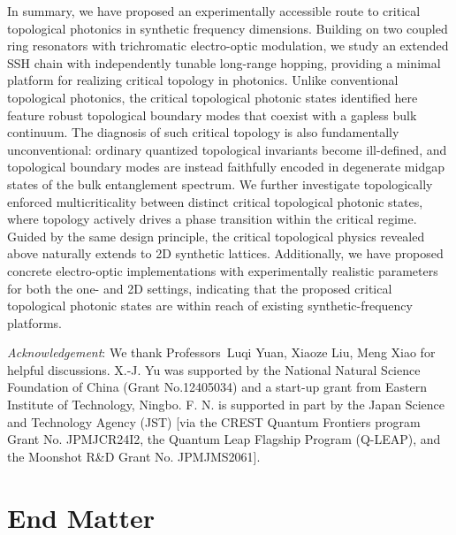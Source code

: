 \documentclass[aps,prl,twocolumn,preprintnumbers,amsmath,amssymb,superscriptaddress,10pt]{revtex4-2}
\begin{document}
In summary, we have proposed an experimentally accessible route to critical topological photonics in synthetic frequency dimensions. Building on two coupled ring resonators with trichromatic electro-optic modulation, we study an extended SSH chain with independently tunable long-range hopping, providing a minimal platform for realizing critical topology in photonics. Unlike conventional topological photonics, the critical topological photonic states identified here feature robust topological boundary modes that coexist with a gapless bulk continuum. The diagnosis of such critical topology is also fundamentally unconventional: ordinary quantized topological invariants become ill-defined, and topological boundary modes are instead faithfully encoded in degenerate midgap states of the bulk entanglement spectrum. We further investigate topologically enforced multicriticality between distinct critical topological photonic states, where topology actively drives a phase transition within the critical regime. Guided by the same design principle, the critical topological physics revealed above naturally extends to 2D synthetic lattices. Additionally, we have proposed concrete electro-optic implementations with experimentally realistic parameters for both the one- and 2D settings, indicating that the proposed critical topological photonic states are within reach of existing synthetic-frequency platforms.



\textit{Acknowledgement}:
We thank Professors~Luqi Yuan, Xiaoze Liu, Meng Xiao for helpful discussions.
X.-J. Yu was supported by the National Natural Science Foundation of China (Grant No.12405034) and a start-up grant from Eastern Institute of Technology, Ningbo. F. N. is supported in part by the Japan Science and Technology Agency (JST) [via the CREST Quantum Frontiers program Grant No. JPMJCR24I2, the Quantum Leap Flagship Program (Q-LEAP), and the Moonshot R\&D Grant No. JPMJMS2061].


% 
% 
\let\oldaddcontentsline\addcontentsline%
\renewcommand{\addcontentsline}[3]{}%
% 



\appendix
\section{\large{End Matter}}
\twocolumngrid
\end{document}

